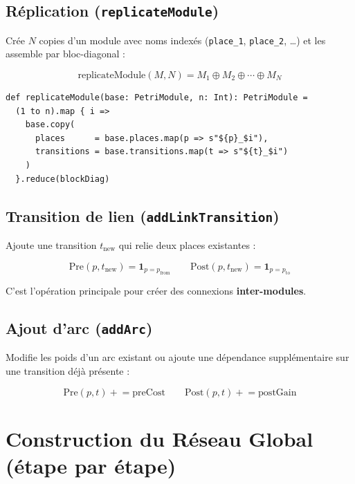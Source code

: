 \documentclass[a4paper,12pt]{article}
\begin{document}
\subsection{Réplication (\texttt{replicateModule})}

Crée $N$ copies d'un module avec noms indexés (\texttt{place\_1}, \texttt{place\_2}, \ldots)
et les assemble par bloc-diagonal :

\[
\mathrm{replicateModule}(M, N) = M_1 \oplus M_2 \oplus \cdots \oplus M_N
\]

\begin{lstlisting}[caption={Réplication d'un module de base}]
def replicateModule(base: PetriModule, n: Int): PetriModule =
  (1 to n).map { i =>
    base.copy(
      places      = base.places.map(p => s"${p}_$i"),
      transitions = base.transitions.map(t => s"${t}_$i")
    )
  }.reduce(blockDiag)
\end{lstlisting}

\subsection{Transition de lien (\texttt{addLinkTransition})}

Ajoute une transition $t_{\mathrm{new}}$ qui relie deux places existantes :

\[
\mathrm{Pre}(p, t_{\mathrm{new}}) = \mathbf{1}_{p = p_{\mathrm{from}}}
\qquad
\mathrm{Post}(p, t_{\mathrm{new}}) = \mathbf{1}_{p = p_{\mathrm{to}}}
\]

C'est l'opération principale pour créer des connexions \textbf{inter-modules}.

\subsection{Ajout d'arc (\texttt{addArc})}

Modifie les poids d'un arc existant ou ajoute une dépendance supplémentaire
sur une transition déjà présente :

\[
\mathrm{Pre}(p, t) \mathrel{+}= \mathrm{preCost}
\qquad
\mathrm{Post}(p, t) \mathrel{+}= \mathrm{postGain}
\]

\newpage
\section{Construction du Réseau Global (étape par étape)}
\end{document}
